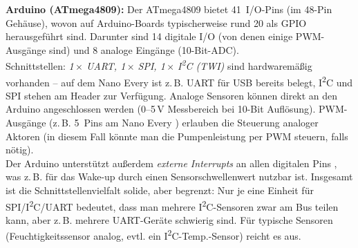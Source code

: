 \textbf{Arduino (ATmega4809):} Der ATmega4809 bietet 41~I/O-Pins (im 48-Pin Gehäuse), wovon auf Arduino-Boards typischerweise rund 20 als GPIO herausgeführt sind. Darunter sind 14 digitale I/O (von denen einige PWM-Ausgänge sind) und 8 analoge Eingänge (10-Bit-ADC). \autocite{atmega_datasheet}
\\
Schnittstellen: \textit{1\,$\times$ UART, 1\,$\times$ SPI, 1\,$\times$ I\textsuperscript{2}C (TWI)} sind hardwaremäßig vorhanden \autocite{atmega_datasheet} – auf dem Nano Every ist z.\,B. UART für USB bereits belegt, I\textsuperscript{2}C und SPI stehen am Header zur Verfügung. Analoge Sensoren können direkt an den Arduino angeschlossen werden (0–5\,V Messbereich bei 10-Bit Auflösung). PWM-Ausgänge (z.\,B. 5~Pins am Nano Every \autocite{atmega_datasheet}) erlauben die Steuerung analoger Aktoren (in diesem Fall könnte man die Pumpenleistung per PWM steuern, falls nötig). 
\\
Der Arduino unterstützt außerdem \textit{externe Interrupts} an allen digitalen Pins \autocite{atmega_datasheet}, was z.\,B. für das Wake-up durch einen Sensorschwellenwert nutzbar ist. Insgesamt ist die Schnittstellenvielfalt solide, aber begrenzt: Nur je eine Einheit für SPI/I\textsuperscript{2}C/UART bedeutet, dass man mehrere I\textsuperscript{2}C-Sensoren zwar am Bus teilen kann, aber z.\,B. mehrere UART-Geräte schwierig sind. Für typische Sensoren (Feuchtigkeitssensor analog, evtl. ein I\textsuperscript{2}C-Temp.-Sensor) reicht es aus.

\vspace{5mm}

